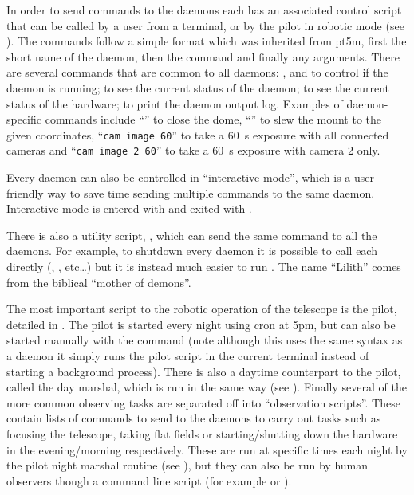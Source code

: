 \begin{colsection}
\begin{colsection}
In order to send commands to the daemons each has an associated control script that can be called by a user from a terminal, or by the pilot in robotic mode (see ). The commands follow a simple format which was inherited from \gls{pt5m}, first the short name of the daemon, then the command and finally any arguments. There are several commands that are common to all daemons: ,  and  to control if the daemon is running;  to see the current status of the daemon;  to see the current status of the hardware;  to print the daemon output log. Examples of daemon-specific commands include ``'' to close the dome, ``'' to slew the mount to the given coordinates, ``\texttt{cam~image~60}'' to take a \SI{60}{\second} exposure with all connected cameras and ``\texttt{cam~image~2~60}'' to take a \SI{60}{\second} exposure with camera 2 only.

Every daemon can also be controlled in ``interactive mode'', which is a user-friendly way to save time sending multiple commands to the same daemon. Interactive mode is entered with  and exited with .

There is also a utility script, , which can send the same command to all the daemons. For example, to shutdown every daemon it is possible to call each directly (, ,  etc\ldots) but it is instead much easier to run . The name ``Lilith'' comes from the biblical ``mother of demons''.

The most important script to the robotic operation of the telescope is the pilot, detailed in . The pilot is started every night using cron at 5pm, but can also be started manually with the command  (note although this uses the same syntax as a daemon it simply runs the pilot script in the current terminal instead of starting a background process). There is also a daytime counterpart to the pilot, called the day marshal, which is run in the same way (see ). Finally several of the more common observing tasks are separated off into ``observation scripts''. These contain lists of commands to send to the daemons to carry out tasks such as focusing the telescope, taking flat fields or starting/shutting down the hardware in the evening/morning respectively. These are run at specific times each night by the pilot night marshal routine (see ), but they can also be run by human observers though a command line script  (for example  or ).

\end{colsection}


\end{colsection}

